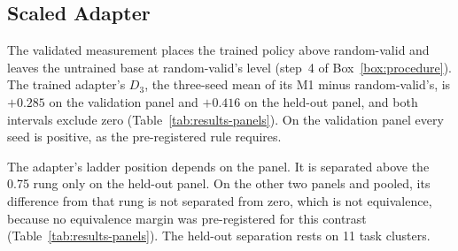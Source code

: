 \subsection{Scaled Adapter}
\label{app:results-adapter}
\label{sec:results-adapter}

The validated measurement places the trained policy above random-valid and leaves the untrained base at random-valid's level (step~4 of Box~\ref{box:procedure}). The trained adapter's $D_3$, the three-seed mean of its M1 minus random-valid's, is $+0.285$ on the validation panel and $+0.416$ on the held-out panel, and both intervals exclude zero (Table~\ref{tab:results-panels}). On the validation panel every seed is positive, as the pre-registered rule requires.

The adapter's ladder position depends on the panel. It is separated above the 0.75 rung only on the held-out panel. On the other two panels and pooled, its difference from that rung is not separated from zero, which is not equivalence, because no equivalence margin was pre-registered for this contrast (Table~\ref{tab:results-panels}). The held-out separation rests on 11 task clusters.

